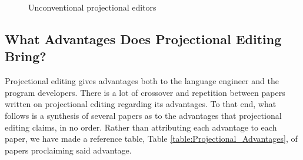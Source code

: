 \begin{figure}[h]
    \begin{center}
        
        \caption{Unconventional projectional editors}
    \label{fig:leftfield}
    \end{center}
\end{figure}

\subsection{What Advantages Does Projectional Editing Bring?}
\label{section:projectional_advantages}

Projectional editing gives advantages both to the language engineer and the program developers.
There is a lot of crossover and repetition between papers written on projectional editing regarding its advantages.
To that end, what follows is a synthesis of several papers as to the advantages that projectional editing claims, in no order.
Rather than attributing each advantage to each paper, we have made a reference table, Table \ref{table:Projectional_Advantages}, of papers proclaiming said advantage. 
 
